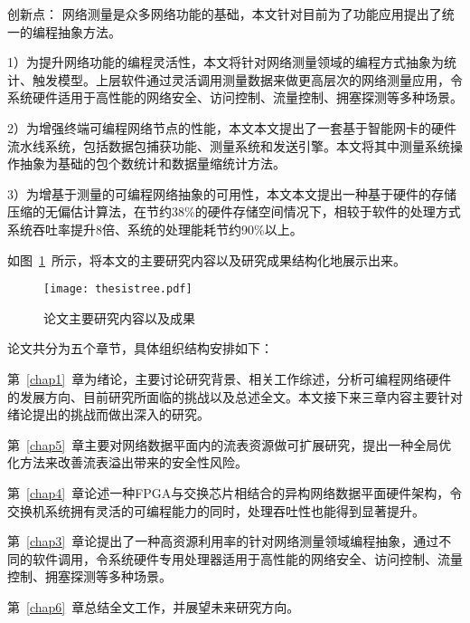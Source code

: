 {\hei 创新点：}
网络测量是众多网络功能的基础，本文针对目前为了功能应用提出了统一的编程抽象方法。

1）为提升网络功能的编程灵活性，本文将针对网络测量领域的编程方式抽象为统计、触发模型。上层软件通过灵活调用测量数据来做更高层次的网络测量应用，令系统硬件适用于高性能的网络安全、访问控制、流量控制、拥塞探测等多种场景。

2）为增强终端可编程网络节点的性能，本文本文提出了一套基于智能网卡的硬件流水线系统，包括数据包捕获功能、测量系统和发送引擎。本文将其中测量系统操作抽象为基础的包个数统计和数据量缩统计方法。

3）为增基于测量的可编程网络抽象的可用性，本文本文提出一种基于硬件的存储压缩的无偏估计算法，在节约38\%的硬件存储空间情况下，相较于软件的处理方式系统吞吐率提升8倍、系统的处理能耗节约90\%以上。



如图~\ref{fig:thesistree}~所示，将本文的主要研究内容以及研究成果结构化地展示出来。


\begin{figure}[!ht]
	\centering 
	\vspace{-1.5mm}
	\texttt{[image: thesistree.pdf]}
	\caption{论文主要研究内容以及成果} \label{fig:thesistree}
\end{figure}







\label{chap15}

论文共分为五个章节，具体组织结构安排如下：

第~\ref{chap1}~章为绪论，主要讨论研究背景、相关工作综述，分析可编程网络硬件的发展方向、目前研究所面临的挑战以及总述全文。本文接下来三章内容主要针对绪论提出的挑战而做出深入的研究。

第~\ref{chap5}~章主要对网络数据平面内的流表资源做可扩展研究，提出一种全局优化方法来改善流表溢出带来的安全性风险。

第~\ref{chap4}~章论述一种FPGA与交换芯片相结合的异构网络数据平面硬件架构，令交换机系统拥有灵活的可编程能力的同时，处理吞吐性也能得到显著提升。

第~\ref{chap3}~章论提出了一种高资源利用率的针对网络测量领域编程抽象，通过不同的软件调用，令系统硬件专用处理器适用于高性能的网络安全、访问控制、流量控制、拥塞探测等多种场景。

第~\ref{chap6}~章总结全文工作，并展望未来研究方向。




































